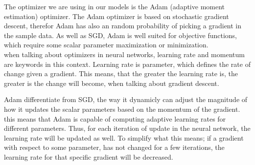 The optimizer we are using in our models is the Adam (adaptive moment estimation)  optimizer. The Adam optimizer is based on stochastic gradient descent\cite{adam}, therefor Adam has also an random probability of picking a gradient in the sample data. As well as SGD, Adam is well suited for objective functions, which require some scalar parameter maximization or minimization. \\

\noindent
when talking about optimizers in neural networks, learning rate and momentum are keywords in this context. Learning rate is parameter, which defines the rate of change given a gradient. This means, that the greater the learning rate is, the greater is the change will become, when talking about gradient descent.

\noindent
Adam differentiate from SGD, the way it dynamicly can adjust the magnitude of how it updates the scalar parameters based on the momentum of the gradient. this means that Adam is capable of computing adaptive learning rates for different parameters\cite{adam}. Thus, for each iteration of update in the neural network, the learning rate will be updated as well. To simplify what this means; if a gradient with respect to some parameter, has not changed for a few iterations, the learning rate for that specific gradient will be decreased.